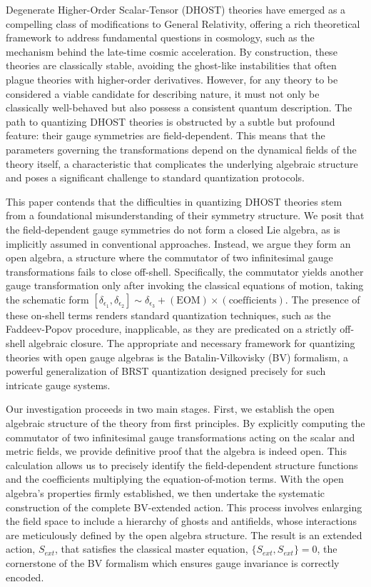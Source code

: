 \documentclass[twocolumn]{aastex631}
\begin{document}
Degenerate Higher-Order Scalar-Tensor (DHOST) theories have emerged as a compelling class of modifications to General Relativity, offering a rich theoretical framework to address fundamental questions in cosmology, such as the mechanism behind the late-time cosmic acceleration. By construction, these theories are classically stable, avoiding the ghost-like instabilities that often plague theories with higher-order derivatives. However, for any theory to be considered a viable candidate for describing nature, it must not only be classically well-behaved but also possess a consistent quantum description. The path to quantizing DHOST theories is obstructed by a subtle but profound feature: their gauge symmetries are field-dependent. This means that the parameters governing the transformations depend on the dynamical fields of the theory itself, a characteristic that complicates the underlying algebraic structure and poses a significant challenge to standard quantization protocols.

This paper contends that the difficulties in quantizing DHOST theories stem from a foundational misunderstanding of their symmetry structure. We posit that the field-dependent gauge symmetries do not form a closed Lie algebra, as is implicitly assumed in conventional approaches. Instead, we argue they form an open algebra, a structure where the commutator of two infinitesimal gauge transformations fails to close off-shell. Specifically, the commutator yields another gauge transformation only after invoking the classical equations of motion, taking the schematic form $[\delta_{\epsilon_1}, \delta_{\epsilon_2}] \sim \delta_{\epsilon_3} + (\text{EOM}) \times (\text{coefficients})$. The presence of these on-shell terms renders standard quantization techniques, such as the Faddeev-Popov procedure, inapplicable, as they are predicated on a strictly off-shell algebraic closure. The appropriate and necessary framework for quantizing theories with open gauge algebras is the Batalin-Vilkovisky (BV) formalism, a powerful generalization of BRST quantization designed precisely for such intricate gauge systems.

Our investigation proceeds in two main stages. First, we establish the open algebraic structure of the theory from first principles. By explicitly computing the commutator of two infinitesimal gauge transformations acting on the scalar and metric fields, we provide definitive proof that the algebra is indeed open. This calculation allows us to precisely identify the field-dependent structure functions and the coefficients multiplying the equation-of-motion terms. With the open algebra's properties firmly established, we then undertake the systematic construction of the complete BV-extended action. This process involves enlarging the field space to include a hierarchy of ghosts and antifields, whose interactions are meticulously defined by the open algebra structure. The result is an extended action, $S_{ext}$, that satisfies the classical master equation, $\{S_{ext}, S_{ext}\} = 0$, the cornerstone of the BV formalism which ensures gauge invariance is correctly encoded.
\end{document}
